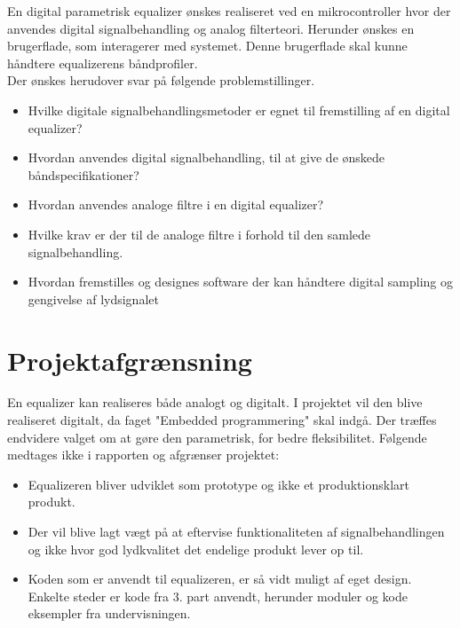 En digital parametrisk equalizer ønskes realiseret ved en mikrocontroller hvor der anvendes digital signalbehandling og analog filterteori. 
Herunder ønskes en brugerflade, som interagerer med systemet. 
Denne brugerflade skal kunne håndtere equalizerens båndprofiler.\\

Der ønskes herudover svar på følgende problemstillinger.
\begin{itemize}[noitemsep]
	\item Hvilke digitale signalbehandlingsmetoder er egnet til fremstilling af en digital equalizer?
	\item Hvordan anvendes digital signalbehandling, til at give de ønskede båndspecifikationer?
	\item Hvordan anvendes analoge filtre i en digital equalizer?
	\item Hvilke krav er der til de analoge filtre i forhold til den samlede signalbehandling.
	\item Hvordan fremstilles og designes software der kan håndtere digital sampling og gengivelse af lydsignalet
\end{itemize}

\section{Projektafgrænsning}

En equalizer kan realiseres både analogt og digitalt.
I projektet vil den blive realiseret digitalt, da faget "Embedded programmering" skal indgå. 
Der træffes endvidere valget om at gøre den parametrisk, for bedre fleksibilitet. 
Følgende medtages ikke i rapporten og afgrænser projektet:
\begin{itemize}[noitemsep]
	\item Equalizeren bliver udviklet som prototype og ikke et produktionsklart produkt.
	\item Der vil blive lagt vægt på at eftervise funktionaliteten af signalbehandlingen og ikke hvor god lydkvalitet det endelige produkt lever op til.
	\item Koden som er anvendt til equalizeren, er så vidt muligt af eget design. Enkelte steder er kode fra 3. part anvendt, herunder moduler og kode eksempler fra undervisningen.
\end{itemize}

